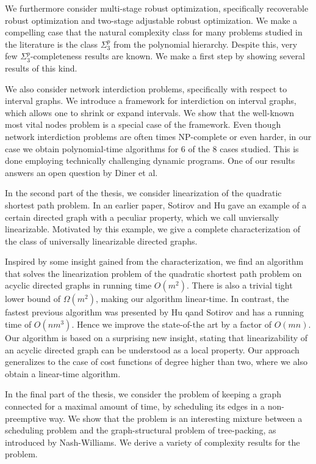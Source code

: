 \documentclass[twoside,openright,bibliography=totoc]{scrreprt}
\begin{document}
We furthermore consider multi-stage robust optimization, specifically recoverable robust optimization and two-stage adjustable robust optimization. We make a compelling case that the natural complexity class for many problems studied in the literature is the class $\Sigma^p_3$ from the polynomial hierarchy. Despite this, very few $\Sigma^p_3$-completeness results are known. We make a first step by showing several results of this kind.

We also consider network interdiction problems, specifically with respect to interval graphs. We introduce a framework for interdiction on interval graphs, which allows one to shrink or expand intervals. We show that the well-known most vital nodes problem is a special case of the framework. Even though network interdiction problems are often times NP-complete or even harder, in our case we obtain polynomial-time algorithms for 6 of the 8 cases studied. This is done employing technically challenging dynamic programs. One of our results answers an open question by Diner et al. 

In the second part of the thesis, we consider linearization of the quadratic shortest path problem. In an earlier paper, Sotirov and Hu gave an example of a certain directed graph with a peculiar property, which we call unviersally linearizable. Motivated by this example, we give a complete characterization of the class of universally linearizable directed graphs. 

Inspired by some insight gained from the characterization,
we find an algorithm that solves the linearization problem of the quadratic shortest path problem on acyclic directed graphs in running time $O(m^2)$. 
There is also a trivial tight lower bound of $\Omega(m^2)$, making our algorithm linear-time. 
In contrast, the fastest previous algorithm was presented by Hu qand Sotirov and has a running time of $O(nm^3)$. Hence we improve the state-of-the art by a factor of $O(mn)$. Our algorithm is based on a surprising new insight, stating that linearizability of an acyclic directed graph can be understood as a local property.  Our approach generalizes to the case of cost functions of degree higher than two, where we also obtain a linear-time algorithm.

In the final part of the thesis, we consider the problem of keeping a graph connected for a maximal amount of time, by scheduling its edges in a non-preemptive way. 
We show that the problem is an interesting mixture between a scheduling problem and the graph-structural problem of tree-packing, as introduced by Nash-Williams. We derive a variety of complexity results for the problem.
\end{document}
